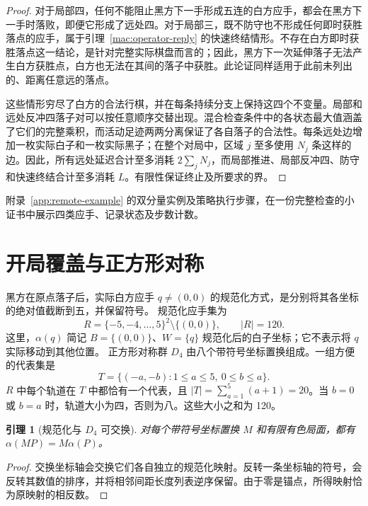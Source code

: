 \documentclass[11pt]{article}
\newtheorem{lemma}[theorem]{引理}
\theoremstyle{definition}
\theoremstyle{remark}
\newcommand{\A}{\alpha}
\begin{document}
\begin{proof}
对于局部四，任何不能阻止黑方下一手形成五连的白方应手，都会在黑方下一手时落败，即便它形成了远处四。对于局部三，既不防守也不形成任何即时获胜落点的应手，属于引理~\ref{mac:operator-reply} 的快速终结情形。不存在白方即时获胜落点这一结论，是针对完整实际棋盘而言的；因此，黑方下一次延伸落子无法产生白方获胜点，白方也无法在其间的落子中获胜。此论证同样适用于此前未列出的、距离任意远的落点。

这些情形穷尽了白方的合法行棋，并在每条持续分支上保持这四个不变量。局部和远处反冲四落子对可以按任意顺序交替出现。混合检查条件中的各状态最大值涵盖了它们的完整乘积，而活动足迹两两分离保证了各自落子的合法性。每条远处边增加一枚实际白子和一枚实际黑子；在整个对局中，区域 \(j\) 至多使用 \(N_j\) 条这样的边。因此，所有远处延迟合计至多消耗 \(2\sum_jN_j\)，而局部推进、局部反冲四、防守和快速终结合计至多消耗 \(L\)。有限性保证终止及所要求的界。
\end{proof}

附录~\ref{app:remote-example} 的双分量实例及策略执行步骤，在一份完整检查的小证书中展示四类应手、记录状态及步数计数。

\section{开局覆盖与正方形对称}
\label{sec:opening}
黑方在原点落子后，实际白方应手 $q\ne(0,0)$ 的规范化方式，是分别将其各坐标的绝对值截断到五，并保留符号。
规范化应手集为
\[
 R=\{-5,-4,\ldots,5\}^2\setminus\{(0,0)\},\qquad |R|=120.
\]
这里，$\A(q)$ 简记 $B=\{(0,0)\}$、$W=\{q\}$ 规范化后的白子坐标；它不表示将 $q$ 实际移动到其他位置。
正方形对称群 $D_4$ 由八个带符号坐标置换组成。一组方便的代表集是
\begin{equation}
 \label{eq:reps}
 T=\{(-a,-b):1\leq a\leq5,\ 0\leq b\leq a\}.
\end{equation}
$R$ 中每个轨道在 $T$ 中都恰有一个代表，且
$|T|=\sum_{a=1}^5(a+1)=20$。当 $b=0$ 或 $b=a$ 时，轨道大小为四，否则为八。这些大小之和为 120。

\begin{lemma}[规范化与 $D_4$ 可交换]
\label{lem:d4}
对每个带符号坐标置换 $M$ 和有限有色局面，都有
$\A(MP)=M\A(P)$。
\end{lemma}
\begin{proof}
交换坐标轴会交换它们各自独立的规范化映射。反转一条坐标轴的符号，会反转其数值的排序，并将相邻间距长度列表逆序保留。由于零是锚点，所得映射恰为原映射的相反数。
\end{proof}
\end{document}
